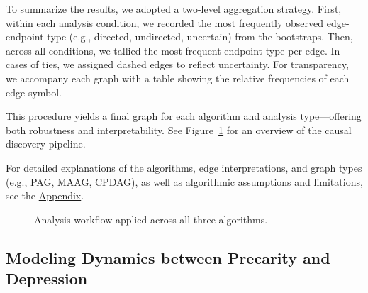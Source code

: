 \documentclass[
]{article}
\begin{document}
To summarize the results, we adopted a two-level aggregation strategy.
First, within each analysis condition, we recorded the most frequently
observed edge-endpoint type (e.g., directed, undirected, uncertain) from
the bootstraps. Then, across all conditions, we tallied the most
frequent endpoint type per edge. In cases of ties, we assigned dashed
edges to reflect uncertainty. For transparency, we accompany each graph
with a table showing the relative frequencies of each edge symbol.

This procedure yields a final graph for each algorithm and analysis
type---offering both robustness and interpretability. See
Figure~\ref{fig-workflow} for an overview of the causal discovery
pipeline.

For detailed explanations of the algorithms, edge interpretations, and
graph types (e.g., PAG, MAAG, CPDAG), as well as algorithmic assumptions
and limitations, see the \hyperref[sec-appendix]{Appendix}.

\begin{figure}


\caption{\label{fig-workflow}Analysis workflow applied across all three
algorithms.}

\end{figure}%

\subsection{Modeling Dynamics between Precarity and
Depression}\label{modeling-dynamics-between-precarity-and-depression}
\end{document}

